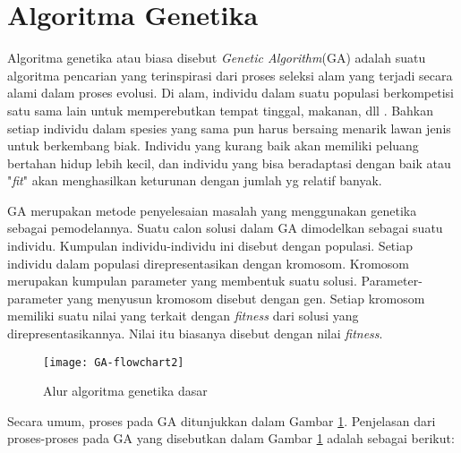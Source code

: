 \section{Algoritma Genetika}
\label{sec:GA}
Algoritma genetika atau biasa disebut \textit{Genetic Algorithm}(GA) adalah suatu algoritma pencarian yang terinspirasi dari proses seleksi alam yang terjadi secara alami dalam proses evolusi. Di alam, individu dalam suatu populasi berkompetisi satu sama lain untuk memperebutkan tempat tinggal, makanan, dll \cite{sivanandam2007introduction}. Bahkan setiap individu dalam spesies yang sama pun harus bersaing menarik lawan jenis untuk berkembang biak. Individu yang kurang baik akan memiliki peluang bertahan hidup lebih kecil, dan individu yang bisa beradaptasi dengan baik atau "\textit{fit}" akan menghasilkan keturunan dengan jumlah yg relatif banyak. 

GA merupakan metode penyelesaian masalah yang menggunakan genetika sebagai pemodelannya. Suatu calon solusi dalam GA dimodelkan sebagai suatu individu. Kumpulan individu-individu ini disebut dengan populasi. Setiap individu dalam populasi direpresentasikan dengan kromosom. Kromosom merupakan kumpulan parameter yang membentuk suatu solusi. Parameter-parameter yang menyusun kromosom disebut dengan gen. Setiap kromosom memiliki suatu nilai yang terkait dengan \textit{fitness} dari solusi yang direpresentasikannya. Nilai itu biasanya disebut dengan nilai \textit{fitness}.


\begin{figure}[H]
	\centering
	\texttt{[image: GA-flowchart2]}
	\caption{Alur algoritma genetika dasar}
	\label{fig:GA-flowchart}
\end{figure}

Secara umum, proses pada GA ditunjukkan dalam Gambar \ref{fig:GA-flowchart}. Penjelasan dari proses-proses pada GA yang disebutkan dalam Gambar \ref{fig:GA-flowchart} adalah sebagai berikut:


